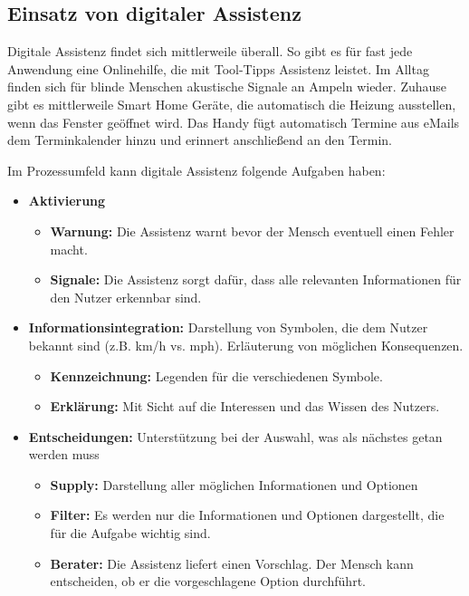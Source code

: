 \subsection{Einsatz von digitaler Assistenz}
Digitale Assistenz findet sich mittlerweile überall. So gibt es für fast jede Anwendung eine Onlinehilfe, die mit Tool-Tipps Assistenz leistet. Im Alltag finden sich für blinde Menschen akustische Signale an Ampeln wieder. Zuhause gibt es mittlerweile Smart Home Geräte, die automatisch die Heizung ausstellen, wenn das Fenster geöffnet wird. Das Handy fügt automatisch Termine aus eMails dem Terminkalender hinzu und erinnert anschließend an den Termin.

Im Prozessumfeld kann digitale Assistenz folgende Aufgaben haben:
\begin{itemize}
\item \textbf{Aktivierung}
	\begin{itemize}
	\item \textbf{Warnung:} Die Assistenz warnt bevor der Mensch eventuell einen Fehler macht.
	\item \textbf{Signale:} Die Assistenz sorgt dafür, dass alle relevanten Informationen für den Nutzer erkennbar sind.
	\end{itemize}
\item \textbf{Informationsintegration:} Darstellung von Symbolen, die dem Nutzer bekannt sind (z.B. km/h vs. mph). Erläuterung von möglichen Konsequenzen.
	\begin{itemize}
	\item \textbf{Kennzeichnung:} Legenden für die verschiedenen Symbole.
	\item \textbf{Erklärung:} Mit Sicht auf die Interessen und das Wissen des Nutzers.
	\end{itemize}
\item \textbf{Entscheidungen:} Unterstützung bei der Auswahl, was als nächstes getan werden muss
	\begin{itemize}
	\item \textbf{Supply:} Darstellung aller möglichen Informationen und Optionen
	\item \textbf{Filter:} Es werden nur die Informationen und Optionen dargestellt, die für die Aufgabe wichtig sind.
	\item \textbf{Berater:} Die Assistenz liefert einen Vorschlag. Der Mensch kann entscheiden, ob er die vorgeschlagene Option durchführt.
	\end{itemize}
\end{itemize}

